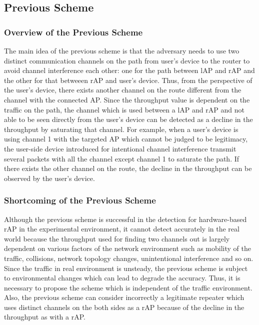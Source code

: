\documentclass[conference]{IEEEtran}
\begin{document}
\subsection{Previous Scheme}
\subsubsection{Overview of the Previous Scheme}
The main idea of the previous scheme \cite{previous} is that the adversary needs to use two distinct communication channels on the path from user's device to the router to avoid channel interference each other: one for the path between lAP and rAP and the other for that betweeen rAP and user's device.
Thus, from the perspective of the user's device, there exists another channel on the route different from the channel with the connected AP. 
Since the throughput value is dependent on the traffic on the path, the channel which is used between a lAP and rAP and not able to be seen directly from the user's device can be detected as a decline in the throughput by saturating that channel.
For example, when a user's device is using channel 1 with the targeted AP which cannot be judged to be legitimacy, the user-side device introduced for intentional channel interference transmit several packets with all the channel except channel 1 to saturate the path.
If there exists the other channel on the route, the decline in the throughput can be observed by the user's device.

\subsubsection{Shortcoming of the Previous Scheme}
Although the previous scheme is successful in the detection for hardware-based rAP in the experimental environment, it cannot detect accurately in the real world because the throughput used for finding two channels out is largely dependent on various factors of the network environment such as mobility of the traffic, collisions, network topology changes, unintentional interference and so on.
Since the traffic in real environment is unsteady, the previous scheme is subject to environmental changes which can lead to degrade the accuracy.
Thus, it is necessary to propose the scheme which is independent of the traffic environment. 
Also, the previous scheme can consider incorrectly a legitimate repeater which uses distinct channels on the both sides as a rAP because of the decline in the throughput as with a rAP.
\end{document}
